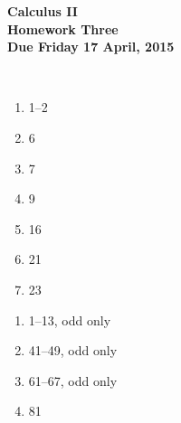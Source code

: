 \documentclass[12pt]{article}
\begin{document}
\pagestyle{empty}
 
\begin{center}
{\large {\bf Calculus II}}\\
\medskip
{\large {\bf Homework Three}}\\
\medskip
{ {\bf Due Friday 17 April, 2015}}\\
\end{center}

\hspace{2mm}\\



\begin{enumerate}
\setlength{\itemsep}{-1mm}
  \item 1--2
  \item 6
  \item 7
  \item 9
  \item 16
  \item 21 
  \item 23

\end{enumerate}


\begin{enumerate}
\setlength{\itemsep}{-1mm}
  \item 1--13, odd only
  \item 41--49, odd only
  \item 61--67, odd only
  \item 81
\end{enumerate}





\end{document}
